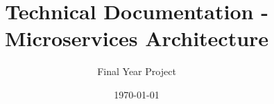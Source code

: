 \documentclass[a4paper,12pt]{report}
\begin{document}
\title{Technical Documentation - Microservices Architecture}
\author{Final Year Project}
\date{\today}
\maketitle

\tableofcontents
\newpage



\end{document}
